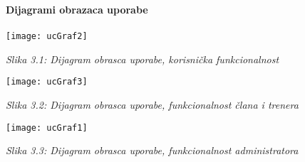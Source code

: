 \documentclass{article}
\begin{document}
		\eject
		
		\textbf{Dijagrami obrazaca uporabe}\\\\
		\texttt{[image: ucGraf2]}
		\begin{center}
			\textit{Slika 3.1: Dijagram obrasca uporabe, korisnička funkcionalnost}
		\end{center}
		\eject
		
		\texttt{[image: ucGraf3]}
		\begin{center}
			\textit{Slika 3.2: Dijagram obrasca uporabe, funkcionalnost člana i trenera}
		\end{center}
		\eject
		
		\texttt{[image: ucGraf1]}
		\begin{center}
			\textit{Slika 3.3: Dijagram obrasca uporabe, funkcionalnost administratora}
		\end{center}
		\eject
		
\end{document}

